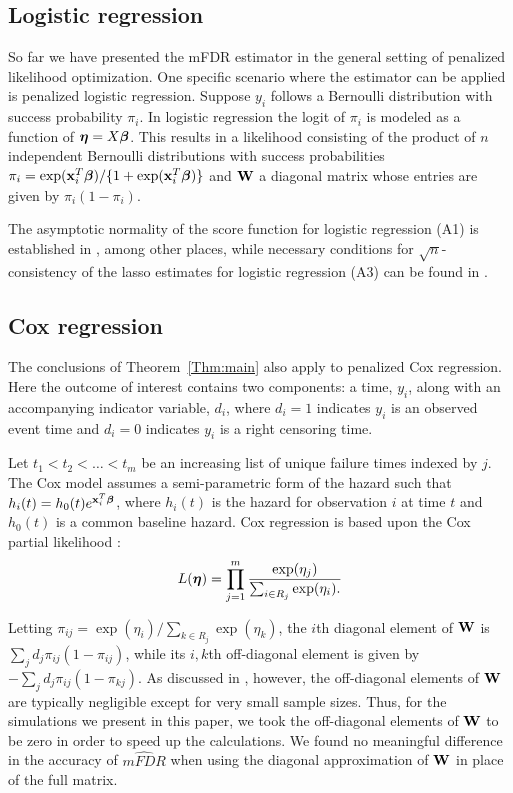 \subsection{Logistic regression}

So far we have presented the mFDR estimator in the general setting of penalized likelihood optimization. One specific scenario where the estimator can be applied is penalized logistic regression. Suppose $y_i$ follows a Bernoulli distribution with success probability $\pi_i$. In logistic regression the logit of $\pi_i$ is modeled as a function of $\boldsymbol{\eta} = X\boldsymbol{\beta}$.  This results in a likelihood consisting of the product of $n$ independent Bernoulli distributions with success probabilities $\pi_i = \exp(\mathbf{x}_i^T\boldsymbol{\beta})/\{1 + \exp(\mathbf{x}_i^T\boldsymbol{\beta})\}$ and $\mathbf{W}$ a diagonal matrix whose entries are given by $\pi_i(1-\pi_i)$.

The asymptotic normality of the score function for logistic regression (A1) is established in \citet{McCullagh1989}, among other places, while necessary conditions for $\sqrt{n}$-consistency of the lasso estimates for logistic regression (A3) can be found in \citet{SCAD}.

\subsection{Cox regression}
\label{Sec:cox}

The conclusions of Theorem~\ref{Thm:main} also apply to penalized Cox regression. Here the outcome of interest contains two components: a time, $y_i$, along with an accompanying indicator variable, $d_i$, where $d_i = 1$ indicates $y_i$ is an observed event time and $d_i = 0$ indicates $y_i$ is a right censoring time.

Let $t_1 < t_2 < \ldots < t_m$ be an increasing list of unique failure times indexed by $j$. The Cox model assumes a semi-parametric form of the hazard such that $h_i(t) = h_0(t)e^{\mathbf{x}_i^T \boldsymbol{\beta}}$, where $h_i(t)$ is the hazard for observation $i$ at time $t$ and $h_0(t)$ is a common baseline hazard. Cox regression is based upon the Cox partial likelihood \citep{Cox1972}:
\begin{equation*}
L(\boldsymbol{\eta})  = \prod_{j=1}^{m} \frac{\exp(\eta_j)}{\sum_{i \in R_j} \exp(\eta_i).} 
\end{equation*}

Letting $\pi_{ij} = \exp(\eta_i)/\sum_{k \in R_j}\exp(\eta_k)$, the $i$th diagonal element of $\mathbf{W}$ is $\sum_j d_j\pi_{ij}(1-\pi_{ij})$, while its $i,k$th off-diagonal element is given by $-\sum_j d_j\pi_{ij}(1-\pi_{kj})$.  As discussed in \citet{Simon2011}, however, the off-diagonal elements of $\mathbf{W}$ are typically negligible except for very small sample sizes.  Thus, for the simulations we present in this paper, we took the off-diagonal elements of $\mathbf{W}$ to be zero in order to speed up the calculations.  We found no meaningful difference in the accuracy of $\widehat{mFDR}$ when using the diagonal approximation of $\mathbf{W}$ in place of the full matrix.

